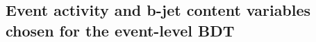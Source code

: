 \subsection{Event activity and b-jet content variables chosen for the event-level BDT}
\label{sec:eventActivity}

